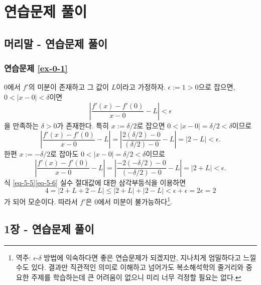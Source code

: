 
\footnotesize

\chapter*[연습문제 풀이]{연습문제 풀이}

\section*{머리말 - 연습문제 풀이}

\setcounter{equation}{0}
\renewcommand\theequation{A.\arabic{equation}}
\setcounter{figure}{0}
\renewcommand\thefigure{A.\arabic{figure}}

\subsection*{연습문제 \ref{ex-0-1}}

$0$에서 $f'$의 미분이 존재하고 그 값이 $L$이라고 가정하자.
$\epsilon:=1>0$으로 잡으면, $0<|x-0|<\delta$이면
\[
\left| \dfrac{f'(x) - f'(0)}{x-0} - L\right| <\epsilon
\]
을 만족하는 $\delta>0$가 존재한다.
특히 $x:=\delta/2$로 잡으면
$0<|x-0| = \delta/2 < \delta$이므로
\begin{equation} \label{eq-5-5} %
\left| \dfrac{f'(x) - f'(0)}{x-0} - L\right|
= \left| \dfrac{2(\delta/2) - 0}{(\delta/2)-0} - L\right| 
= |2-L| < \epsilon.
\end{equation}
한편 $x:=-\delta/2$로 잡아도
$0<|x-0| = \delta/2 < \delta$이므로
\begin{equation} \label{eq-5-6}
\left| \dfrac{f'(x) - f'(0)}{x-0} - L\right|
= \left| \dfrac{-2(-\delta/2) - 0}{(-\delta/2)-0} - L\right| 
= |2+L| < \epsilon.
\end{equation}
식 \eqref{eq-5-5}\와 \eqref{eq-5-6}
실수 절대값에 대한 삼각부등식을  이용하면
\[
4 = |2+L+2-L| \le |2+L| + |2-L|
<\epsilon + \epsilon = 2\epsilon = 2
\]
가 되어 모순이다.
따라서 $f'$은 $0$에서 미분이 불가능하다\footnote{
역주: $\epsilon$-$\delta$ 방법에 익숙하다면 좋은 연습문제가 되겠지만,
지나치게 엄밀하다고 느낄 수도 있다.
결과만 직관적인 의미로 이해하고 넘어가도 복소해석학의 줄거리와 중요한 주제를 학습하는데 큰 어려움이 없으니
미리 너무 걱정할 필요는 없다.
}.

\section*{1장 - 연습문제 풀이}

